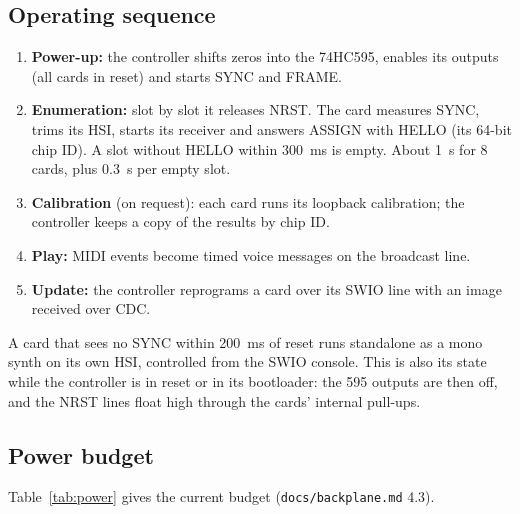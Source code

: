 \documentclass[11pt,a4paper]{article}
\newcommand{\file}[1]{\texttt{#1}}
\begin{document}
\subsection{Operating sequence}
\begin{enumerate}
  \item \textbf{Power-up:} the controller shifts zeros into the 74HC595, enables its outputs (all cards in reset)
    and starts SYNC and FRAME.
  \item \textbf{Enumeration:} slot by slot it releases NRST. The card measures SYNC, trims its HSI, starts its
    receiver and answers ASSIGN with HELLO (its 64-bit chip ID). A slot without HELLO within \SI{300}{ms} is empty.
    About \SI{1}{s} for 8 cards, plus \SI{0.3}{s} per empty slot.
  \item \textbf{Calibration} (on request): each card runs its loopback calibration; the controller keeps a copy of
    the results by chip ID.
  \item \textbf{Play:} MIDI events become timed voice messages on the broadcast line.
  \item \textbf{Update:} the controller reprograms a card over its SWIO line with an image received over CDC.
\end{enumerate}
A card that sees no SYNC within \SI{200}{ms} of reset runs standalone as a mono synth on its own HSI, controlled from
the SWIO console. This is also its state while the controller is in reset or in its bootloader: the 595 outputs are
then off, and the NRST lines float high through the cards' internal pull-ups.

\subsection{Power budget}\label{sec:power}
Table~\ref{tab:power} gives the current budget (\file{docs/backplane.md} 4.3).
\end{document}
